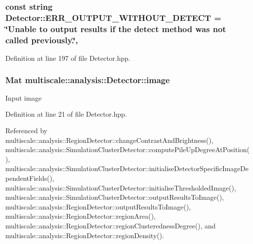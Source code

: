 \hypertarget{classmultiscale_1_1analysis_1_1Detector_a5837f0e4ffef6410774ff9bcda72238b}{
\subsubsection[{E\-R\-R\-\_\-\-O\-U\-T\-P\-U\-T\-\_\-\-W\-I\-T\-H\-O\-U\-T\-\_\-\-D\-E\-T\-E\-C\-T}]{\setlength{\rightskip}{0pt plus 5cm}const string Detector\-::\-E\-R\-R\-\_\-\-O\-U\-T\-P\-U\-T\-\_\-\-W\-I\-T\-H\-O\-U\-T\-\_\-\-D\-E\-T\-E\-C\-T = \char`\"{}Unable to output results if the {\bf detect} method was not called previously.\char`\"{}\hspace{0.3cm}{\ttfamily [static]}, {\ttfamily [protected]}}}\label{classmultiscale_1_1analysis_1_1Detector_a5837f0e4ffef6410774ff9bcda72238b}


Definition at line 197 of file Detector.\-hpp.

\hypertarget{classmultiscale_1_1analysis_1_1Detector_a523830a6cfe409694ce8327c3c736fbd}{
\subsubsection[{image}]{\setlength{\rightskip}{0pt plus 5cm}Mat multiscale\-::analysis\-::\-Detector\-::image\hspace{0.3cm}{\ttfamily [protected]}}}\label{classmultiscale_1_1analysis_1_1Detector_a523830a6cfe409694ce8327c3c736fbd}
Input image 

Definition at line 21 of file Detector.\-hpp.



Referenced by multiscale\-::analysis\-::\-Region\-Detector\-::change\-Contrast\-And\-Brightness(), multiscale\-::analysis\-::\-Simulation\-Cluster\-Detector\-::compute\-Pile\-Up\-Degree\-At\-Position(), multiscale\-::analysis\-::\-Simulation\-Cluster\-Detector\-::initialise\-Detector\-Specific\-Image\-Dependent\-Fields(), multiscale\-::analysis\-::\-Simulation\-Cluster\-Detector\-::initialise\-Thresholded\-Image(), multiscale\-::analysis\-::\-Simulation\-Cluster\-Detector\-::output\-Results\-To\-Image(), multiscale\-::analysis\-::\-Region\-Detector\-::output\-Results\-To\-Image(), multiscale\-::analysis\-::\-Region\-Detector\-::region\-Area(), multiscale\-::analysis\-::\-Region\-Detector\-::region\-Clusteredness\-Degree(), and multiscale\-::analysis\-::\-Region\-Detector\-::region\-Density().

